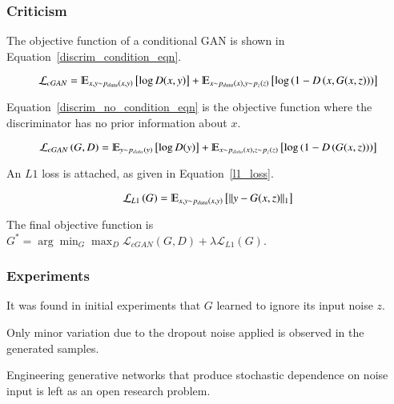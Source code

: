 \documentclass[a4paper, 12pt]{article}
\DeclarePairedDelimiter\norm{\lVert}{\rVert}%
\begin{document}
\subsubsection{Criticism}

The objective function of a conditional GAN is shown in Equation~\ref{discrim_condition_eqn}.

\begin{equation}
        \mathcal{L}_{cGAN} = \varmathbb{E}_{x, y \sim p_{data}(x, y)}\left[\log D(x, y)\right] +
                             \varmathbb{E}_{x \sim p_{data}(x), y \sim p_z (z)}\left[\log \left(1 - D\left(x, G(x, z)\right)\right)\right]
        \label{discrim_condition_eqn}
\end{equation}

Equation~\ref{discrim_no_condition_eqn} is the objective function where the
discriminator has no prior information about $x$.

\begin{equation}
        \mathcal{L}_{cGAN}\left(G, D\right) =
                \varmathbb{E}_{y \sim p_{data}(y)}\left[\log D(y)\right] +
                \varmathbb{E}_{x \sim p_{data}(x), z \sim p_z (z)}\left[\log \left(1 - D\left(G(x, z)\right)\right)\right]
        \label{discrim_no_condition_eqn}
\end{equation}

An $L1$ loss is attached, as given in Equation~\ref{l1_loss}.

\begin{equation}
        \mathcal{L}_{L1}\left(G\right) = \varmathbb{E}_{x, y \sim p_{data}(x, y)}\left[\norm{y - G(x, z)}_1\right]
        \label{l1_loss}
\end{equation}

The final objective function is
$G^* = \arg\min_G \max_D \mathcal{L}_{cGAN}\left(G, D\right) + \lambda \mathcal{L}_{L1}\left(G\right)$.

\subsubsection{Experiments}

It was found in initial experiments that $G$ learned to ignore its input noise
$z$.

Only minor variation due to the dropout noise applied is observed in the
generated samples.

Engineering generative networks that produce stochastic dependence on noise
input is left as an open research problem.
\end{document}
